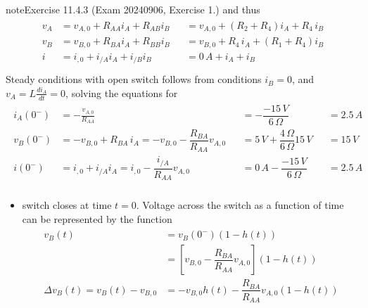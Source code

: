 \documentclass[letterpaper,10pt,english]{jupyterBook}
\begin{document}
\begin{sphinxadmonition}{note}{Exercise 11.4.3 (Exam 2024\sphinxhyphen{}09\sphinxhyphen{}06, Exercise 1.)}
\sphinxAtStartPar
and thus
\begin{equation*}
\begin{split}\begin{aligned}
  v_A & = v_{A,0} + R_{AA} i_A + R_{AB} i_B && = v_{A,0} + \left( R_2+R_4 \right) i_A +        R_4     \,      i_B \\
  v_B & = v_{B,0} + R_{BA} i_A + R_{BB} i_B && = v_{B,0} +        R_4     \,      i_A + \left( R_1+R_4 \right) i_B \\
  i   & = i_{ ,0} + i_{/A} i_A + i_{/B} i_B && =  0 \, A +        i_A +        i_B \\
\end{aligned}\end{split}
\end{equation*}
\sphinxAtStartPar
{} Steady conditions with open switch follows from conditions \(i_B = 0\), and \(v_A = L \frac{d i_A}{d t} = 0\), solving the equations for
\begin{equation*}
\begin{split}\begin{aligned}
    i_A(0^-) & = - \frac{v_{A,0}}{R_{AA}} && = - \dfrac{-15 \, V}{6 \, \Omega} && = 2.5 \, A \\
    v_B(0^-) & = - v_{B,0} + R_{BA} \, i_A  = - v_{B,0} - \dfrac{R_{BA}}{R_{AA}} v_{A,0} && = 5 \, V + \dfrac{4 \, \Omega}{6 \, \Omega} 15 \, V && = 15 \, V \\ 
    i  (0^-) & = i_{ ,0} + i_{/A} i_A =  i_{ ,0} - \dfrac{i_{/A}}{R_{AA}} v_{A,0} && = 0 \, A - \dfrac{-15 \, V}{6 \, \Omega} && = 2.5 \, A \\
  \end{aligned}\end{split}
\end{equation*}
\sphinxAtStartPar
{}
\begin{itemize}
\item {} 
\sphinxAtStartPar
switch closes at time \(t = 0\). Voltage across the switch as a function of time can be represented by the function
\begin{equation*}
\begin{split}\begin{aligned}
      v_{B}(t) & = v_B(0^-) \left( 1 - h(t) \right) \\
               & = \left[ v_{B,0} - \dfrac{R_{BA}}{R_{AA}} v_{A,0} \right] \left( 1 - h(t) \right) \\
      \Delta v_{B}(t) = v_{B}(t) - v_{B,0}  & =  - v_{B,0} h(t) - \dfrac{R_{BA}}{R_{AA}} v_{A,0} \left( 1 - h(t) \right) \\

\end{aligned}
\end{split}
\end{equation*}
\end{itemize}
\end{sphinxadmonition}
\end{document}
